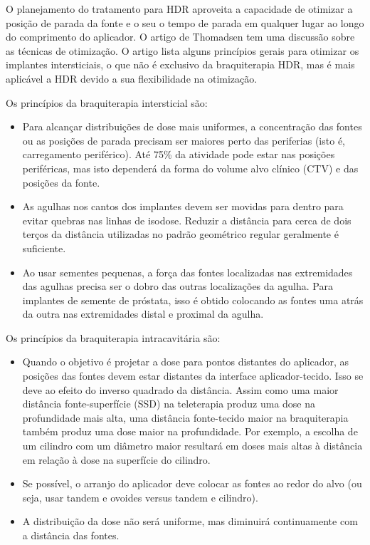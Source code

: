 \documentclass[11pt,a4paper]{article}
\newcounter{exemplo}
\begin{document}
	O planejamento do tratamento para HDR aproveita a capacidade de otimizar a posição de parada da fonte e o seu o tempo de parada em qualquer lugar ao longo do comprimento do aplicador. O artigo de Thomadsen\cite{thomadsen2008anniversary} tem uma discussão sobre as técnicas de otimização. O artigo lista alguns princípios gerais para otimizar os implantes intersticiais, o que não é exclusivo da braquiterapia HDR, mas é mais aplicável a HDR devido a sua flexibilidade na otimização. 
	
	Os princípios da braquiterapia intersticial são:

	\begin{itemize}[label=\textcolor{CarnationPink}{$\blacktriangleright$}]
		\item Para alcançar distribuições de dose mais uniformes, a concentração das fontes ou as posições de parada precisam ser maiores perto das periferias (isto é, carregamento periférico). Até 75\% da atividade pode estar nas posições periféricas, mas isto dependerá da forma do volume alvo clínico (CTV) e das posições da fonte.
		\item As agulhas nos cantos dos implantes devem ser movidas para dentro para evitar quebras nas linhas de isodose. Reduzir a distância para cerca de dois terços da distância utilizadas no padrão geométrico regular geralmente é suficiente.
		\item Ao usar sementes pequenas, a força das fontes localizadas nas extremidades das agulhas precisa ser o dobro das outras localizações da agulha. Para implantes de semente de próstata, isso é obtido colocando as fontes uma atrás da outra nas extremidades distal e proximal da agulha.
	\end{itemize}

	Os princípios da braquiterapia intracavitária são:

	\begin{itemize}[label=\textcolor{CarnationPink}{$\blacktriangleright$}]
		\item Quando o objetivo é projetar a dose para pontos distantes do aplicador, as posições das fontes devem estar distantes da interface aplicador-tecido. Isso se deve ao efeito do inverso quadrado da distância. Assim como uma maior distância fonte-superfície (SSD) na teleterapia produz uma dose na profundidade mais alta, uma distância fonte-tecido maior na braquiterapia também produz uma dose maior na profundidade. Por exemplo, a escolha de um cilindro com um diâmetro maior resultará em doses mais altas à distância em relação à dose na superfície do cilindro.
		\item Se possível, o arranjo do aplicador deve colocar as fontes ao redor do alvo (ou seja, usar tandem e ovoides versus tandem e cilindro).
		\item A distribuição da dose não será uniforme, mas diminuirá continuamente com a distância das fontes.
	\end{itemize}
\end{document}
